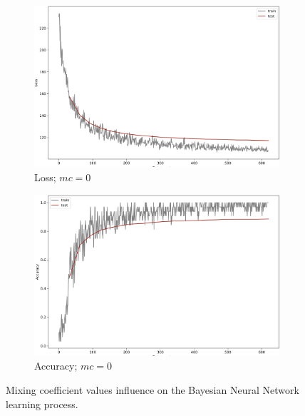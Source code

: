 \begin{figure}[]
     \centering
     \begin{subfigure}[b]{0.48\textwidth}
         \centering
         \includegraphics[width=\textwidth]{observational/img/bnn/mc/LC_mc1e-10.png}
         \caption{Loss; $mc=0$}
     \end{subfigure}
     \hfill
     \begin{subfigure}[b]{0.48\textwidth}
         \centering
         \includegraphics[width=\textwidth]{observational/img/bnn/mc/AC_mc1e-10.png}
         \caption{Accuracy; $mc=0$}
     \end{subfigure}
     \caption[Mixing coefficient values influence on the BNN learning process]{Mixing coefficient values influence on the Bayesian Neural Network learning process.}
    \label{fig:bnn-mc}
\end{figure}
